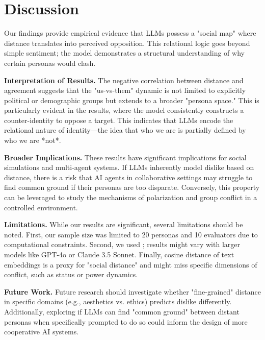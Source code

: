 \section{Discussion}

Our findings provide empirical evidence that LLMs possess a "social map" where distance translates into perceived opposition. This relational logic goes beyond simple sentiment; the model demonstrates a structural understanding of why certain personas would clash.

{\bf Interpretation of Results.} The negative correlation between distance and agreement suggests that the "us-vs-them" dynamic is not limited to explicitly political or demographic groups but extends to a broader "persona space." This is particularly evident in the \schismogenesis results, where the model consistently constructs a counter-identity to oppose a target. This indicates that LLMs encode the relational nature of identity—the idea that who we are is partially defined by who we are *not*.

{\bf Broader Implications.} These results have significant implications for social simulations and multi-agent systems. If LLMs inherently model dislike based on distance, there is a risk that AI agents in collaborative settings may struggle to find common ground if their personas are too disparate. Conversely, this property can be leveraged to study the mechanisms of polarization and group conflict in a controlled environment.

{\bf Limitations.} While our results are significant, several limitations should be noted. First, our sample size was limited to 20 personas and 10 evaluators due to computational constraints. Second, we used \gpt; results might vary with larger models like GPT-4o or Claude 3.5 Sonnet. Finally, cosine distance of text embeddings is a proxy for "social distance" and might miss specific dimensions of conflict, such as status or power dynamics.

{\bf Future Work.} Future research should investigate whether "fine-grained" distance in specific domains (e.g., aesthetics vs. ethics) predicts dislike differently. Additionally, exploring if LLMs can find "common ground" between distant personas when specifically prompted to do so could inform the design of more cooperative AI systems.
